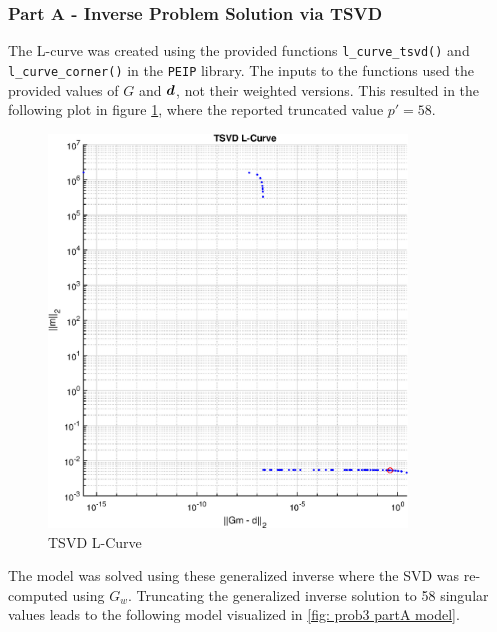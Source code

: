 \subsubsection{Part A - Inverse Problem Solution via TSVD}

The L-curve was created using the provided functions \verb*|l_curve_tsvd()| and \verb*|l_curve_corner()| in the \verb*|PEIP| library. The inputs to the functions used the provided values of $G$ and $\boldsymbol{d}$, not their weighted versions. This resulted in the following plot in figure \ref{fig: prob3 partA L-curve}, where the reported truncated value $p' = 58$.

 \begin{figure}[h] 
 	\centering
 	\includegraphics[width=0.85\textwidth]{./images/prob3_partA_TSVD_L_Curve.eps}
 	\caption{TSVD L-Curve}
 	\label{fig: prob3 partA L-curve}
 \end{figure}
 \FloatBarrier
 
 The model was solved using these generalized inverse where the SVD was re-computed using $G_w$. Truncating the generalized inverse solution to 58 singular values leads to the following model visualized in \ref{fig: prob3 partA model}.
 
